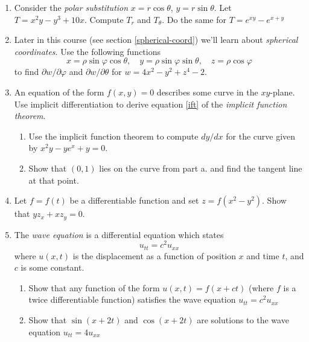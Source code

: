 \documentclass[12pt]{article}
\numberwithin{equation}{subsection}
\numberwithin{figure}{subsection}
\theoremstyle{note}
\begin{document}
{\begin{enumerate}[label=\arabic*.]
\begin{enumerate}
	\item $z=x^2y-\tan (xy)$, \quad $x=u^2+2v, y=3\sin v$; \quad $(u,v)=(0,\pi/6)$
	\item $z=\cos (y\sin x)$, \quad $x=2uv, y=u^2-e^{v}$; \quad $(u,v)=(0,0)$
	\item $z=\ln(2+x)+y$,\quad $x=u-v, y=\arcsin(v-u)$\quad $(u,v)=(1/2,0)$
\end{enumerate}

\item Consider the \textit{polar substitution} $x=r\cos \theta$, $y=r\sin \theta$. Let $T=x^2y-y^3+10x$. Compute $T_r$ and $T_{\theta}$. Do the same for $T=e^{xy}-e^{x+y}$

\item Later in this course (see section \ref{spherical-coord}) we'll learn about \textit{spherical coordinates}. Use the following functions \[x=\rho \sin \varphi \cos \theta, \quad y=\rho \sin \varphi \sin \theta, \quad z=\rho \cos \varphi\] to find $\partial w/\partial \varphi$ and $\partial w/\partial \theta$ for $w=4x^2-y^2+z^4-2$.


\item An equation of the form $f(x,y)=0$ describes some curve in the $xy$-plane. Use implicit differentiation to derive equation \eqref{ift} of the \textit{implicit function theorem}.

\begin{enumerate}
\item Use the implicit function theorem to compute $dy/dx$ for the curve given by $x^2y-ye^{x}+y=0$. 
\item Show that $(0,1)$ lies on the curve from part a. and find the tangent line at that point.%
\end{enumerate}

\item Let $f=f(t)$ be a differentiable function and set $z=f(x^2-y^2)$. Show that $y z_x+xz_y=0$.

\item The \textit{wave equation} is a differential equation which states \[ u_{tt}=c^2 u_{xx}\] where $u(x,t)$ is the displacement as a function of position $x$ and time $t$, and $c$ is some constant. 
\begin{enumerate}

\item Show that any function of the form $u(x,t)=f(x+ct)$ (where $f$ is a twice differentiable function) satisfies the wave equation $u_{tt}=c^2 u_{xx}$
\item Show that $\sin(x+2t)$ and $\cos(x+2t)$ are solutions to the wave equation $u_{tt}=4u_{xx}$
	

\end{enumerate}
\end{enumerate}}
\end{document}
